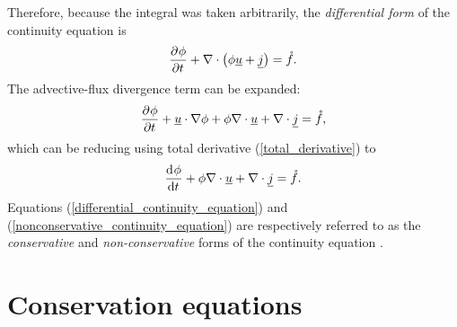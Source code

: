 Therefore, because the integral was taken arbitrarily, the \emph{differential form} of the continuity equation is
\begin{align}
  \label{differential_continuity_equation}
  \frac{\partial{^{}} \phi}{\partial t{^{}} } + \nabla \cdot \left( \phi \underline{u} + \underline{j} \right) = \mathring{f}.
\end{align}
The advective-flux divergence term can be expanded:
\begin{align*}
  \frac{\partial{^{}} \phi}{\partial t{^{}} } + \underline{u} \cdot \nabla \phi + \phi \nabla \cdot \underline{u} + \nabla \cdot \underline{j} = \mathring{f},
\end{align*}
which can be reducing using total derivative (\ref{total_derivative}) to 
\begin{align}
  \label{nonconservative_continuity_equation}
  \frac{\mathrm{d}{^{}} \phi}{\mathrm{d} t{^{}} } + \phi \nabla \cdot \underline{u} + \nabla \cdot \underline{j} = \mathring{f}.
\end{align}
Equations (\ref{differential_continuity_equation}) and (\ref{nonconservative_continuity_equation}) are respectively referred to as the \emph{conservative} and \emph{non-conservative} forms of the continuity equation \citep{anderson_1995}.

\section{Conservation equations} \label{ssn_conservation_equations}

